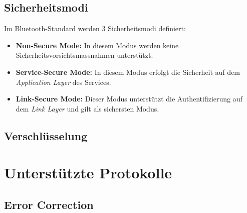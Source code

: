 \subsection{Sicherheitsmodi}
Im Bluetooth-Standard werden 3 Sicherheitsmodi definiert:
\begin{itemize}
	\item \textbf{Non-Secure Mode:} In diesem Modus werden keine Sicherheitsvorsichtsmassnahmen unterstützt.
	\item \textbf{Service-Secure Mode:} In diesem Modus erfolgt die Sicherheit auf dem \textit{Application Layer} des Services.
	\item \textbf{Link-Secure Mode:} Dieser Modus unterstützt die Authentifizierung auf dem \textit{Link Layer} und gilt als sichersten Modus.
\end{itemize}

\subsection{Verschlüsselung}


\section{Unterstützte Protokolle}

\subsection{Error Correction}




